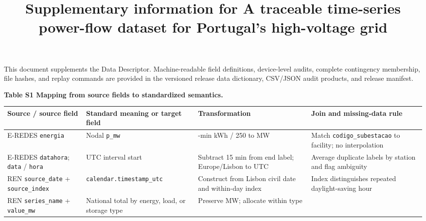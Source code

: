 \documentclass[
  10pt]{article}
\title{Supplementary information for A traceable time-series power-flow
dataset for Portugal's high-voltage grid}
\author{}
\date{}
\begin{document}
\maketitle

This document supplements the Data Descriptor. Machine-readable field
definitions, device-level audits, complete contingency membership, file
hashes, and replay commands are provided in the versioned release data
dictionary, CSV/JSON audit products, and release manifest.

\textbf{Table S1 \textbar{} Mapping from source fields to standardized
semantics.}

\begin{longtable}[]{@{}
  >{\raggedright\arraybackslash}p{}
  >{\raggedright\arraybackslash}p{}
  >{\raggedright\arraybackslash}p{}
  >{\raggedright\arraybackslash}p{}@{}}
\toprule\noalign{}
\begin{minipage}[b]{\linewidth}\raggedright
Source / source field
\end{minipage} & \begin{minipage}[b]{\linewidth}\raggedright
Standard meaning or target field
\end{minipage} & \begin{minipage}[b]{\linewidth}\raggedright
Transformation
\end{minipage} & \begin{minipage}[b]{\linewidth}\raggedright
Join and missing-data rule
\end{minipage} \\
\midrule\noalign{}
\endhead
\bottomrule\noalign{}
\endlastfoot
E-REDES \texttt{energia} & Nodal \texttt{p\_mw} & 15-min kWh / 250 to MW
& Match \texttt{codigo\_subestacao} to facility; no interpolation \\
E-REDES \texttt{datahora}; \texttt{data} / \texttt{hora} & UTC interval
start & Subtract 15 min from end label; Europe/Lisbon to UTC & Average
duplicate labels by station and flag ambiguity \\
REN \texttt{source\_date} + \texttt{source\_index} &
\texttt{calendar.timestamp\_utc} & Construct from Lisbon civil date and
within-day index & Index distinguishes repeated daylight-saving hour \\
REN \texttt{series\_name} + \texttt{value\_mw} & National total by
energy, load, or storage type & Preserve MW; allocate within type &

\end{longtable}
\end{document}
